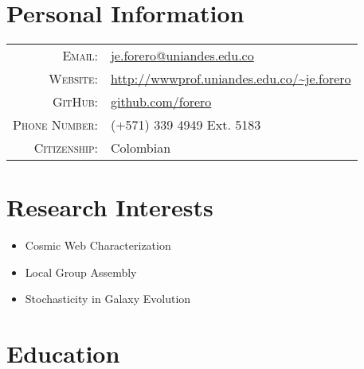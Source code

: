 \documentclass[a4paper,10pt]{article} %
\begin{document}
\pagestyle{empty} %




\par{ \bigskip\par} %

\color{red}
\section{Personal Information}
\color{black}


\begin{tabular}{rl}
\textsc{Email:} & \href{mailto:je.forero@uniandes.edu.co}{je.forero@uniandes.edu.co}\\
\textsc{Website:} & \url{http://wwwprof.uniandes.edu.co/~je.forero}\\
\textsc{GitHub:} & \url{github.com/forero}\\
\textsc{Phone Number:} & (+571) 339 4949 Ext. 5183\\
\textsc{Citizenship:} & Colombian
\end{tabular}



\color{red}
\section{Research Interests}
\color{black}
\begin{itemize}
\item{Cosmic Web Characterization}
\item{Local Group Assembly}
\item{Stochasticity in Galaxy Evolution}
\end{itemize}


\color{red}
\section{Education}
\color{black}
\end{document}
